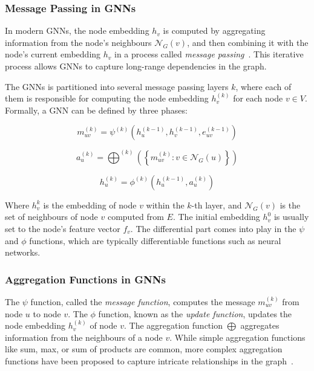\subsubsection{Message Passing in GNNs}

In modern \acp{GNN}, the node embedding $h_v$ is computed by aggregating information from the node's neighbours $\mathcal{N}_G(v)$, and then combining it with the node's current embedding $h_v$ in a process called \emph{message passing}~\cite{DBLP:conf/icml/GilmerSRVD17}. This iterative process allows \acp{GNN} to capture long-range dependencies in the graph.

The \acp{GNN} is partitioned into several message passing layers $k$, where each of them is responsible for computing the node embedding $h_v^{(k)}$ for each node $v \in V$. Formally, a \ac{GNN} can be defined by three phases:

\begin{equation}
m^{(k)}_{uv} = \psi^{(k)}\left(h_u^{(k-1)}, h_v^{(k-1)}, e^{(k-1)}_{uv}\right) 
\end{equation}

\begin{equation}
a^{(k)}_u = \bigoplus^{(k)}\left(\left\{m^{(k)}_{uv}: v \in \mathcal{N}_G(u)\right\}\right)
\end{equation}

\begin{equation}
h_u^{(k)} = \phi^{(k)}\left(h_u^{(k-1)}, a^{(k)}_u\right)
\end{equation}

Where $h_{v}^{k}$ is the embedding of node $v$ within the $k$-th layer, and $\mathcal{N}_G(v)$ is the set of neighbours of node $v$ computed from $E$. The initial embedding $h_v^0$ is usually set to the node's feature vector $f_v$. The differential part comes into play in the $\psi$ and $\phi$ functions, which are typically differentiable functions such as neural networks.

\subsubsection{Aggregation Functions in GNNs}

The $\psi$ function, called the \emph{message function}, computes the message $m_{uv}^{(k)}$ from node $u$ to node $v$. The $\phi$ function, known as the \emph{update function}, updates the node embedding $h_v^{(k)}$ of node $v$. The aggregation function $\bigoplus$ aggregates information from the neighbours of a node $v$. While simple aggregation functions like sum, max, or sum of products are common, more complex aggregation functions have been proposed to capture intricate relationships in the graph~\cite{pellegrini2020learning}.

